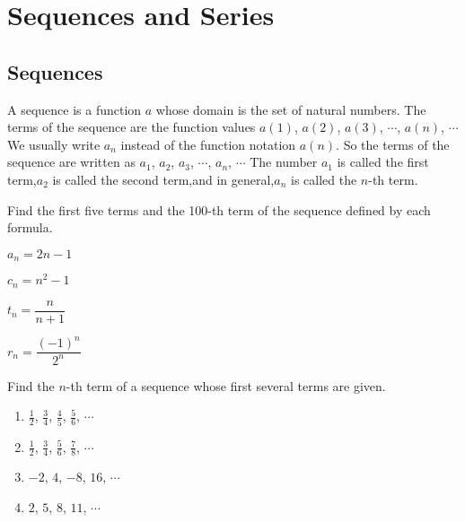 
\chapter{Sequences and Series}

\section{Sequences}

\begin{definition}
A sequence is a function $a$ whose domain is the set of natural numbers. The terms of the sequence are the function values $a(1)$, $a(2)$, $a(3)$, $\cdots$, $a(n)$, $\cdots$
We usually write $a_n$ instead of the function notation $a(n)$. So the terms of the sequence are written as
$a_1$, $a_2$, $a_3$, $\cdots$, $a_n$, $\cdots$
The number $a_1$ is called the first term,$a_2$ is called the second term,and in general,$a_n$ is called the $n$-th term.
\end{definition}
\begin{example}
    Find the first five terms and the 100-th term of the sequence defined by each formula.\\
    \begin{enumerate*}
        \item $a_n=2n-1$
        \item $c_n=n^2-1$
        \item $t_n=\dfrac{n}{n+1}$
        \item $r_n=\dfrac{(-1)^n}{2^n}$\hfill\null
    \end{enumerate*}
\end{example}

\begin{example}
    Find the $n$-th term of a sequence whose first several terms are given.
    \begin{enumerate}
        \item $\frac{1}{2}$, $\frac{3}{4}$, $\frac{4}{5}$, $\frac{5}{6}$, $\cdots$
        \item $\frac{1}{2}$, $\frac{3}{4}$, $\frac{5}{6}$, $\frac{7}{8}$, $\cdots$
        \item $-2$, $4$, $-8$, $16$, $\cdots$
        \item $2$, $5$, $8$, $11$, $\cdots$
    \end{enumerate}
\end{example}

\newpage

